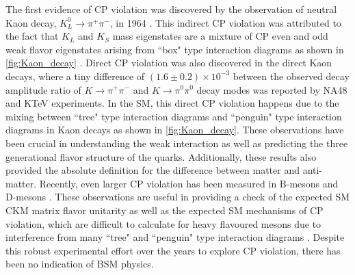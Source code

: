 
The first evidence of CP violation was discovered by the observation of neutral Kaon decay, $K_L^0 \rightarrow \pi^+ \pi^-$, in 1964 \cite{Christenson1964}. This indirect CP violation was attributed to the fact that $K_L$ and $K_S$ mass eigenstates are a mixture of CP even and odd weak flavor eigenstates arising from ``box" type interaction diagrams as shown in \cref{fig:Kaon_decay} \cite{PDG2022, Bigi2009, Sozzi2008}. Direct CP violation was also discovered in the direct Kaon decays, where a tiny difference of $\left( 1.6 \pm 0.2 \right) \times 10^{-3}$ between the observed decay amplitude ratio of $ K \rightarrow \pi^+ \pi^- $ and $ K \rightarrow  \pi^0 \pi^0 $ decay modes was reported by NA48 \cite{Batley2002} and KTeV \cite{Abouzaid2011} experiments. In the SM, this direct CP violation happens due to the mixing between ``tree" type interaction diagrams and ``penguin" type interaction diagrams in Kaon decays \cite{PDG2022, Bigi2009, Sozzi2008} as shown in \cref{fig:Kaon_decay}. These observations have been crucial in understanding the weak interaction as well as predicting the three generational flavor structure of the quarks. Additionally, these results also provided the absolute definition for the difference between matter and anti-matter. Recently, even larger CP violation has been measured in B-mesons \cite{Aubert2001, Abe2001, Aaij2013} and D-mesons \cite{Aaij2019}. These observations are useful in providing a check of the expected SM CKM matrix flavor unitarity as well as the expected SM mechanisms of CP violation, which are difficult to calculate for heavy flavoured mesons due to interference from many ``tree" and ``penguin" type interaction diagrams \cite{PDG2022}. Despite this robust experimental effort over the years to explore CP violation, there has been no indication of BSM physics.

